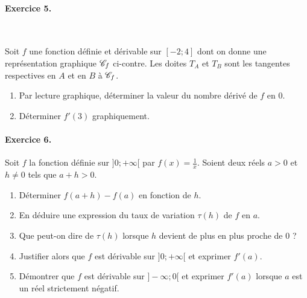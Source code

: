 \documentclass[11pt]{article}
\begin{document}
\paragraph{Exercice 5.}~\\
\begin{minipage}{.5\textwidth}
  Soit $f$ une fonction définie et dérivable sur $[-2;4]$ dont on donne une
  représentation graphique $\mathscr{C}_f$ ci-contre. Les doites $T_A$ et $T_B$ sont les
  tangentes respectives en $A$ et en $B$ à $\mathscr{C}_f$.
  \begin{enumerate}
    \item Par lecture graphique, déterminer la valeur du nombre dérivé de $f$ en
      $0$.
    \item Déterminer $f'(3)$ graphiquement.
  \end{enumerate}
\end{minipage}
\begin{minipage}{.5\textwidth}
\begin{center}
\end{center}
\end{minipage}

\paragraph{Exercice 6.} Soit $f$ la fonction définie sur $]0; +\infty[$ par
  $f(x)=\frac{1}{x}$. Soient deux réels $a>0$ et $h\neq0$ tels que $a+h>0$.
  \begin{enumerate}
    \item Déterminer $f(a+h)-f(a)$ en fonction de $h$.
    \item En déduire une expression du taux de variation $\tau(h)$ de $f$ en
      $a$.
    \item Que peut-on dire de $\tau(h)$ lorsque $h$ devient de plus en plus
      proche de $0$ ?
  \item Justifier alors que $f$ est dérivable sur $]0; +\infty[$ et exprimer
      $f'(a)$.
  \item Démontrer que $f$ est dérivable sur $]-\infty; 0[$ et exprimer $f'(a)$
      lorsque $a$ est un réel strictement négatif.
  \end{enumerate}
\end{document}
